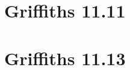 \documentclass[11pt]{article}
\begin{document}
\newpage

\section*{Griffiths 11.11}


\newpage

\section*{Griffiths 11.13}
\end{document}
